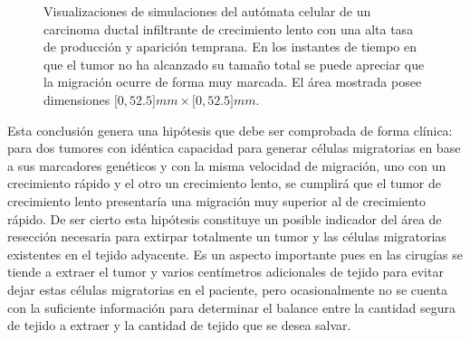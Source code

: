 \begin{figure}[p]
\begin{center}
\end{center}\vspace*{-0.6cm}
\caption[Visualizaciones de simulaciones del aut\'omata celular de un carcinoma ductal infiltrante de crecimiento lento con una alta tasa de producci\'on y aparici\'on temprana]{Visualizaciones de simulaciones del aut\'omata celular de un carcinoma ductal infiltrante de crecimiento lento con una alta tasa de producci\'on y aparici\'on temprana. En los instantes de tiempo en que el tumor no ha alcanzado su tama\~no total se puede apreciar que la migraci\'on ocurre de forma muy marcada. El \'area mostrada posee dimensiones $[0,52$.$5]mm \times [0,52$.$5]mm$.}
\label{fig-automata-superior-migra}
\end{figure}

Esta conclusi\'on genera una hip\'otesis que debe ser comprobada de forma cl\'inica: para dos tumores con id\'entica capacidad para generar c\'elulas migratorias en base a sus marcadores gen\'eticos y con la misma velocidad de migraci\'on, uno con un crecimiento r\'apido y el otro un crecimiento lento, se cumplir\'a que el tumor de crecimiento lento presentar\'ia una migraci\'on muy superior al de crecimiento r\'apido. De ser cierto esta hip\'otesis constituye un posible indicador del \'area de resecci\'on necesaria para extirpar totalmente un tumor y las c\'elulas migratorias existentes en el tejido adyacente. Es un aspecto importante pues en las cirug\'ias se tiende a extraer el tumor y varios cent\'imetros adicionales de tejido para evitar dejar estas c\'elulas migratorias en el paciente, pero ocasionalmente no se cuenta con la suficiente informaci\'on para determinar el balance entre la cantidad segura de tejido a extraer y la cantidad de tejido que se desea salvar. 

